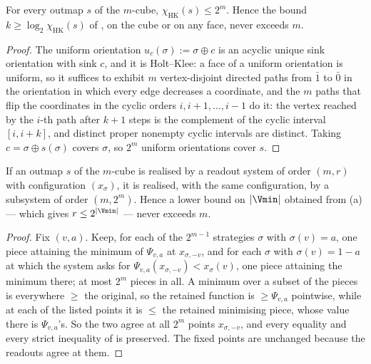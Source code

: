 \begin{proposition}
\label{lvl:chi-cap}
For every outmap $s$ of the $m$-cube, $\chi_{\mathrm{HK}}(s)\le2^{m}$.  Hence
the bound $k\ge\log_2\chi_{\mathrm{HK}}(s)$ of , on the
cube or on any face, never exceeds $m$.
\end{proposition}

\begin{proof}
The uniform orientation $u_c(\sigma):=\sigma\oplus c$ is an acyclic unique sink
orientation with sink $c$, and it is Holt--Klee: a face of a uniform
orientation is uniform, so it suffices to exhibit $m$ vertex-disjoint directed
paths from $\bar1$ to $\bar0$ in the orientation in which every edge decreases
a coordinate, and the $m$ paths that flip the coordinates in the cyclic orders
$i,i+1,\dots,i-1$ do it: the vertex reached by the $i$-th path after $k+1$
steps is the complement of the cyclic interval $[i,i+k]$, and distinct proper
nonempty cyclic intervals are distinct.  Taking $c=\sigma\oplus s(\sigma)$
covers $\sigma$, so $2^{m}$ uniform orientations cover $s$.
\end{proof}

\begin{proposition}
\label{lvl:order-cap}
If an outmap $s$ of the $m$-cube is realised by a readout system of order
$(m,r)$ with configuration $(x_\sigma)$, it is realised, with the same
configuration, by a subsystem of order $(m,2^{m})$.  Hence a lower bound on
$|\Vmin|$ obtained from (a) --- which gives
$r\le2^{|\Vmin|}$ --- never exceeds $m$.
\end{proposition}

\begin{proof}
Fix $(v,a)$.  Keep, for each of the $2^{m-1}$ strategies $\sigma$ with
$\sigma(v)=a$, one piece attaining the minimum of $\Psi_{v,a}$ at
$x_{\sigma,-v}$, and for each $\sigma$ with $\sigma(v)=1-a$ at which the
system asks for $\Psi_{v,a}(x_{\sigma,-v})<x_\sigma(v)$, one piece attaining
the minimum there; at most $2^{m}$ pieces in all.  A minimum over a subset of
the pieces is everywhere $\ge$ the original, so the retained function is
$\ge\Psi_{v,a}$ pointwise, while at each of the listed points it is $\le$ the
retained minimising piece, whose value there is $\Psi_{v,a}$'s.  So the two
agree at all $2^{m}$ points $x_{\sigma,-v}$, and every equality and every
strict inequality of  is preserved.  The fixed points
are unchanged because the readouts agree at them.
\end{proof}


